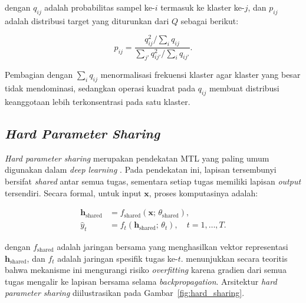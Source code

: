 \noindent dengan $q_{ij}$ adalah probabilitas sampel ke-$i$ termasuk ke klaster
ke-$j$, dan $p_{ij}$ adalah distribusi target yang diturunkan dari $Q$
sebagai berikut:

\begin{equation}
    p_{ij} = \frac{q_{ij}^2 / \sum_i q_{ij}}{\sum_{j'} q_{ij'}^2 /
    \sum_i q_{ij'}}.
    \label{eq:target_distribution}
\end{equation}

Pembagian dengan $\sum_i q_{ij}$ menormalisasi frekuensi klaster agar
klaster yang besar tidak mendominasi, sedangkan operasi kuadrat pada
$q_{ij}$ membuat distribusi keanggotaan lebih terkonsentrasi pada satu
klaster.

\subsection{\textit{Hard Parameter Sharing}}

\textit{Hard parameter sharing} merupakan pendekatan MTL yang paling umum
digunakan dalam \textit{deep learning} \parencite{ruder2017overview}. Pada
pendekatan ini, lapisan tersembunyi bersifat \textit{shared} antar semua
tugas, sementara setiap tugas memiliki lapisan \textit{output} tersendiri.
Secara formal, untuk input $\mathbf{x}$, proses komputasinya adalah:

\begin{align}
    \mathbf{h}_{\text{shared}} &= f_{\text{shared}}(\mathbf{x};\,
        \theta_{\text{shared}}), \label{eq:hard_shared} \\
    \hat{y}_t &= f_t(\mathbf{h}_{\text{shared}};\, \theta_t),
        \quad t = 1, \ldots, T. \label{eq:hard_task}
\end{align}

\noindent dengan $f_{\text{shared}}$ adalah jaringan bersama yang menghasilkan
vektor representasi $\mathbf{h}_{\text{shared}}$, dan $f_t$ adalah
jaringan spesifik tugas ke-$t$. \parencite{baxter2000model} menunjukkan
secara teoritis bahwa mekanisme ini mengurangi risiko \textit{overfitting}
karena gradien dari semua tugas mengalir ke lapisan bersama selama
\textit{backpropagation}. Arsitektur \textit{hard parameter sharing}
diilustrasikan pada Gambar~\ref{fig:hard_sharing}.

